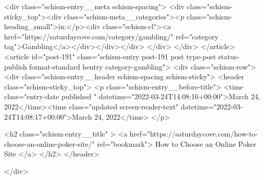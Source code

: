 {		<div class="schism-entry__meta schism-spacing">			<div class="schism-sticky_top"><div class="schism-meta__categories"><p class="schism-heading_small">in:</p><div class="schism-cl"><a href="https://saturdaycove.com/category/gambling/" rel="category tag">Gambling</a></div></div></div>		</div>
	</div>
</article>
<article id="post-191" class="schism-entry post-191 post type-post status-publish format-standard hentry category-gambling">
	<div class="schism-row">		<div class="schism-entry__header schism-spacing schism-sticky">			<header class="schism-sticky_top">				<p class="schism-entry__before-title">
					<time class="entry-date published " datetime="2022-03-24T14:08:16+00:00">March 24, 2022</time><time class="updated screen-reader-text" datetime="2022-03-24T14:08:17+00:00">March 24, 2022</time>				</p>

				<h2 class="schism-entry__title" >
					<a href="https://saturdaycove.com/how-to-choose-an-online-poker-site/" rel="bookmark">
						How to Choose an Online Poker Site					</a>
				</h2>
			</header>

					</div>

}
